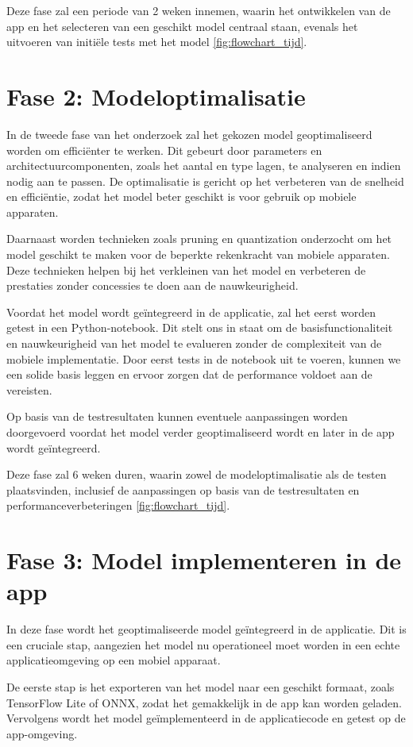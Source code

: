 Deze fase zal een periode van 2 weken innemen, waarin het ontwikkelen van de app en het selecteren van een geschikt model centraal staan, evenals het uitvoeren van initiële tests met het model \ref{fig:flowchart_tijd}.

\section{Fase 2: Modeloptimalisatie}
In de tweede fase van het onderzoek zal het gekozen model geoptimaliseerd worden om efficiënter te werken. 
Dit gebeurt door parameters en architectuurcomponenten, zoals het aantal en type lagen, te analyseren en indien nodig aan te passen. 
De optimalisatie is gericht op het verbeteren van de snelheid en efficiëntie, zodat het model beter geschikt is voor gebruik op mobiele apparaten.

Daarnaast worden technieken zoals pruning en quantization onderzocht om het model geschikt te maken voor de beperkte rekenkracht van mobiele apparaten. 
Deze technieken helpen bij het verkleinen van het model en verbeteren de prestaties zonder concessies te doen aan de nauwkeurigheid.

Voordat het model wordt geïntegreerd in de applicatie, zal het eerst worden getest in een Python-notebook. 
Dit stelt ons in staat om de basisfunctionaliteit en nauwkeurigheid van het model te evalueren zonder de complexiteit van de mobiele implementatie. 
Door eerst tests in de notebook uit te voeren, kunnen we een solide basis leggen en ervoor zorgen dat de performance voldoet aan de vereisten.

Op basis van de testresultaten kunnen eventuele aanpassingen worden doorgevoerd voordat het model verder geoptimaliseerd wordt en later in de app wordt geïntegreerd.

Deze fase zal 6 weken duren, waarin zowel de modeloptimalisatie als de testen plaatsvinden, inclusief de aanpassingen op basis van de testresultaten en performanceverbeteringen \ref{fig:flowchart_tijd}.

\section{Fase 3: Model implementeren in de app}
In deze fase wordt het geoptimaliseerde model geïntegreerd in de applicatie. 
Dit is een cruciale stap, aangezien het model nu operationeel moet worden in een echte applicatieomgeving op een mobiel apparaat.

De eerste stap is het exporteren van het model naar een geschikt formaat, zoals TensorFlow Lite of ONNX, zodat het gemakkelijk in de app kan worden geladen. 
Vervolgens wordt het model geïmplementeerd in de applicatiecode en getest op de app-omgeving.

